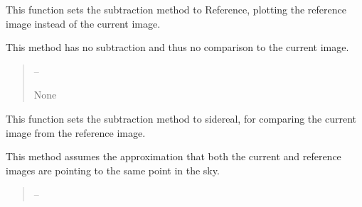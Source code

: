 \documentclass[letterpaper,11pt,english]{sphinxmanual}
\begin{document}
\begin{savenotes}
\begin{fulllineitems}

\begin{savenotes}\begin{fulllineitems}
\label{\detokenize{code/opihiexarata.gui.selector:opihiexarata.gui.selector.TargetSelectorWindow.__connect_push_button_mode_reference}}
\pysigstartsignatures
{}
\pysigstopsignatures
\sphinxAtStartPar
This function sets the subtraction method to Reference, plotting
the reference image instead of the current image.

\sphinxAtStartPar
This method has no subtraction and thus no comparison to the current
image.
\begin{quote}\begin{description}
\sphinxAtStartPar
{} – 

\sphinxAtStartPar
None

\end{description}\end{quote}

\end{fulllineitems}\end{savenotes}


\begin{savenotes}\begin{fulllineitems}
\label{\detokenize{code/opihiexarata.gui.selector:opihiexarata.gui.selector.TargetSelectorWindow.__connect_push_button_mode_sidereal}}
\pysigstartsignatures
{}
\pysigstopsignatures
\sphinxAtStartPar
This function sets the subtraction method to sidereal, for comparing
the current image from the reference image.

\sphinxAtStartPar
This method assumes the approximation that both the current and
reference images are pointing to the same point in the sky.
\begin{quote}\begin{description}
\sphinxAtStartPar
{} – 


\end{description}
\end{quote}
\end{fulllineitems}
\end{savenotes}
\end{fulllineitems}
\end{savenotes}
\end{document}
